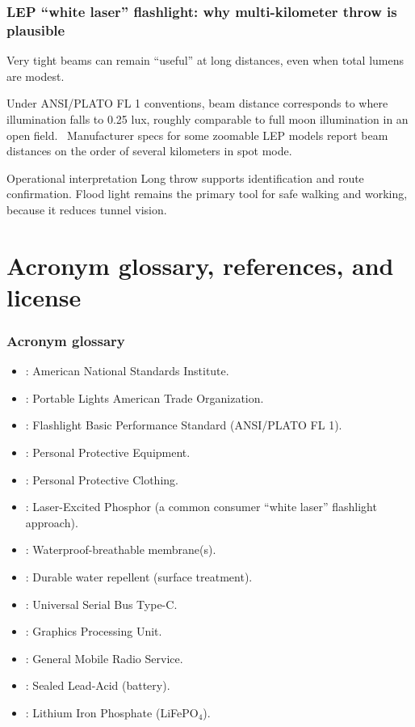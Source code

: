 \begin{frame}[t]
  \frametitle{LEP ``white laser'' flashlight: why multi-kilometer throw is plausible}
  \justifying
   Very tight beams can remain ``useful'' at long distances, even when total lumens are modest.

  \vspace{0.5em}
   Under ANSI/PLATO FL 1 conventions, beam distance corresponds to where illumination falls to 0.25 lux, roughly comparable to full moon illumination in an open field.~\cite{plato_fl1} Manufacturer specs for some zoomable LEP models report beam distances on the order of several kilometers in spot mode.~\cite{acebeam_w50_20}

  \vspace{0.8em}
  \begin{block}{Operational interpretation}
    Long throw supports identification and route confirmation. Flood light remains the primary tool for safe walking and working, because it reduces tunnel vision.
  \end{block}
\end{frame}


\section{Acronym glossary, references, and license}

\begin{frame}[t]
  \frametitle{Acronym glossary}
  \justifying
  \begin{itemize}
    \item {}: American National Standards Institute.
    \item {}: Portable Lights American Trade Organization.
    \item {}: Flashlight Basic Performance Standard (ANSI/PLATO FL 1).
    \item {}: Personal Protective Equipment.
    \item {}: Personal Protective Clothing.
    \item {}: Laser-Excited Phosphor (a common consumer ``white laser'' flashlight approach).
    \item {}: Waterproof-breathable membrane(s).
    \item {}: Durable water repellent (surface treatment).
    \item {}: Universal Serial Bus Type-C.
    \item {}: Graphics Processing Unit.
    \item {}: General Mobile Radio Service.
    \item {}: Sealed Lead-Acid (battery).
    \item {}: Lithium Iron Phosphate (LiFePO$_4$).
  \end{itemize}
\end{frame}

